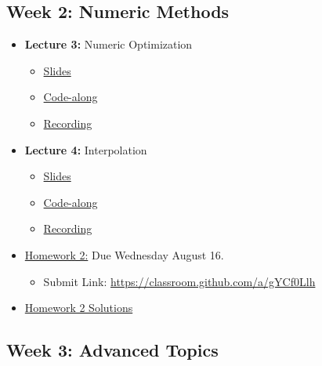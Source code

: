 \documentclass[
]{book}
\providecommand{\tightlist}{%
  \setlength{\itemsep}{0pt}\setlength{\parskip}{0pt}}
\begin{document}
\hypertarget{week-2-numeric-methods}{%
\subsection{Week 2: Numeric Methods}\label{week-2-numeric-methods}}

\begin{itemize}
\tightlist
\item
  \textbf{Lecture 3:} Numeric Optimization

  \begin{itemize}
  \tightlist
  \item
    \href{https://kevinghunt.github.io/ComputationCamp/lectures/Lecture3.html}{Slides}
  \item
    \href{https://kevinghunt.github.io/ComputationCamp/codealongs/CodeAlong3.jl}{Code-along}
  \item
    \href{https://uwmadison.zoom.us/rec/share/xD1LsrLsUF8XtJUjPTVDA_2d52EKgQTF1a6Dc3lBOSB7JlRk4PMUi_h0oMRnMtb5.VW6mJ7BkoiC6riUk}{Recording}
  \end{itemize}
\item
  \textbf{Lecture 4:} Interpolation

  \begin{itemize}
  \tightlist
  \item
    \href{https://kevinghunt.github.io/ComputationCamp/lectures/Lecture4.html}{Slides}
  \item
    \href{https://kevinghunt.github.io/ComputationCamp/codealongs/CodeAlong4.jl}{Code-along}
  \item
    \href{https://uwmadison.zoom.us/rec/share/YNnLYBVpnTSQsMTHQGDDWx2n89gURdYXzVWM8dRyV4o91bAfmCkC8q1IT3f-jo3B.msXmwKB-ZcXcIZRL}{Recording}
  \end{itemize}
\item
  \href{https://kevinghunt.github.io/ComputationCamp/homeworks/homework2.html}{Homework 2:} Due Wednesday August 16.

  \begin{itemize}
  \tightlist
  \item
    Submit Link: \url{https://classroom.github.com/a/gYCf0Llh}
  \end{itemize}
\item
  \href{https://kevinghunt.github.io/ComputationCamp/homework_solutions/Homework2_solutions.jl}{Homework 2 Solutions}
\end{itemize}

\hypertarget{week-3-advanced-topics}{%
\subsection{Week 3: Advanced Topics}\label{week-3-advanced-topics}}
\end{document}

